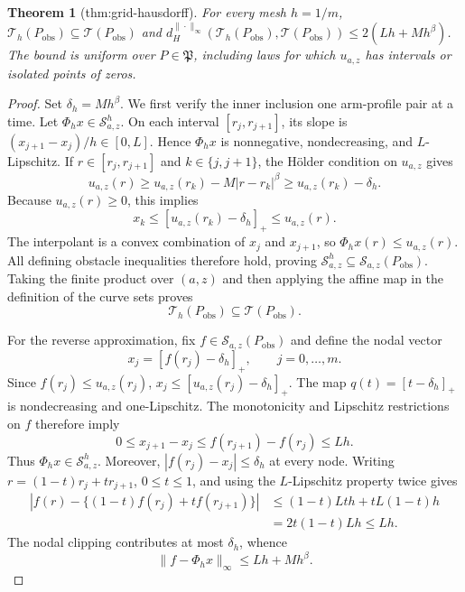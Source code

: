 \documentclass{article}
\newtheorem{theorem}{Theorem}
\begin{document}
\begin{theorem}[thm:grid-hausdorff]\label{thm:grid-hausdorff}
For every mesh \(h=1/m\), \(\mathcal T_h(P_{\mathrm{obs}})\subseteq\mathcal T(P_{\mathrm{obs}})\) and \(d_H^{\|\cdot\|_\infty}(\mathcal T_h(P_{\mathrm{obs}}),\mathcal T(P_{\mathrm{obs}}))\le2(Lh+Mh^\beta)\). The bound is uniform over \(P\in\mathfrak P\), including laws for which \(u_{a,z}\) has intervals or isolated points of zeros.
\end{theorem}
\begin{proof}
Set \(\delta_h=Mh^\beta\).  We first verify the inner inclusion one
arm-profile pair at a time.  Let \(\Phi_hx\in\mathcal S^h_{a,z}\).  On each
interval \([r_j,r_{j+1}]\), its slope is
\((x_{j+1}-x_j)/h\in[0,L]\).  Hence \(\Phi_hx\) is nonnegative,
nondecreasing, and \(L\)-Lipschitz.  If
\(r\in[r_j,r_{j+1}]\) and \(k\in\{j,j+1\}\), the H\"older condition on
\(u_{a,z}\) gives
\[
 u_{a,z}(r)\ge u_{a,z}(r_k)-M|r-r_k|^\beta
             \ge u_{a,z}(r_k)-\delta_h.
\]
Because \(u_{a,z}(r)\ge0\), this implies
\[
 x_k\le [u_{a,z}(r_k)-\delta_h]_+\le u_{a,z}(r).
\]
The interpolant is a convex combination of \(x_j\) and \(x_{j+1}\), so
\(\Phi_hx(r)\le u_{a,z}(r)\).  All defining obstacle inequalities therefore
hold, proving
\(\mathcal S^h_{a,z}\subseteq\mathcal S_{a,z}(P_{\mathrm{obs}})\).
Taking the finite product over \((a,z)\) and then applying the affine map in
the definition of the curve sets proves
\[
 \mathcal T_h(P_{\mathrm{obs}})\subseteq\mathcal T(P_{\mathrm{obs}}).
\]

For the reverse approximation, fix
\(f\in\mathcal S_{a,z}(P_{\mathrm{obs}})\) and define the nodal vector
\[
 x_j=[f(r_j)-\delta_h]_+,
 \qquad j=0,\ldots,m.
\]
Since \(f(r_j)\le u_{a,z}(r_j)\),
\(x_j\le[u_{a,z}(r_j)-\delta_h]_+\).  The map
\(q(t)=[t-\delta_h]_+\) is nondecreasing and one-Lipschitz.  The monotonicity
and Lipschitz restrictions on \(f\) therefore imply
\[
 0\le x_{j+1}-x_j
 \le f(r_{j+1})-f(r_j)
 \le Lh.
\]
Thus \(\Phi_hx\in\mathcal S^h_{a,z}\).  Moreover,
\(|f(r_j)-x_j|\le\delta_h\) at every node.  Writing
\(r=(1-t)r_j+tr_{j+1}\), \(0\le t\le1\), and using the
\(L\)-Lipschitz property twice gives
\[
\begin{aligned}
\left|f(r)-\{(1-t)f(r_j)+tf(r_{j+1})\}\right|
&\le(1-t)Lth+tL(1-t)h\\
&=2t(1-t)Lh\le Lh.
\end{aligned}
\]
The nodal clipping contributes at most \(\delta_h\), whence
\[
 \|f-\Phi_hx\|_\infty\le Lh+Mh^\beta.
\]


\end{proof}
\end{document}
